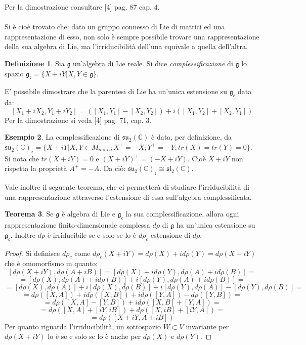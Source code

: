 \documentclass[12pt,a4paper]{report}
\theoremstyle{definition}
\newtheorem{Def}{Definizione}[chapter]
\newtheorem{Theo}[Def]{Teorema}
\theoremstyle{definition}
\newtheorem{Ex}[Def]{Esempio}
\theoremstyle{definition}
\theoremstyle{definition}
\begin{document}
Per la dimostrazione consultare [4] pag. 87 cap. 4.\\
\\
Si è cioè trovato che: dato un gruppo connesso di Lie di matrici ed una rappresentazione di esso, non solo è sempre possibile trovare una rappresentazione della sua algebra di Lie, ma l'irriducibilità dell'una equivale a quella dell'altra.
\begin{Def}
	Sia $\mathfrak{g}$ un'algebra di Lie reale. Si dice \textit{complessificazione} di $\mathfrak{g}$ lo spazio $\mathfrak{g_c}=\{X+iY|X,Y\in\mathfrak{g}\}$.
\end{Def}
E' possibile dimostrare che la parentesi di Lie ha un'unica estensione su $\mathfrak{g_c}$ data da:
$$[X_1+iX_2,Y_1+iY_2]=([X_1,Y_1]-[X_2,Y_2])+i([X_1,Y_2]+[X_2,Y_1])$$
Per la dimostrazione si veda [4] pag. 71, cap. 3.\\
\begin{Ex}
La complessificazione di $\mathfrak{su_2(\mathbb{C})}$ è data, per definizione, da \\$\mathfrak{su_2(\mathbb{C})_c}=\{X+iY|X,Y\in M_{n\times n} ;X^{+}=-X;Y^{+}=-Y;tr(X)=tr(Y)=0\}$.\\
Si nota che $tr(X+iY)=0$ e $(X+iY)^+=(-X+iY)$. Cioè $X+iY$ non rispetta la proprietà $A^+=-A$. Da ciò: $\mathfrak{su_2(\mathbb{C})_c}\cong \mathfrak{sl_2(\mathbb{C})}$.
\end{Ex}
Vale inoltre il seguente teorema, che ci permetterà di studiare l'irriducibilità di una rappresentazione attraverso l'estensione di essa sull'algebra complessificata.
\begin{Theo}
	Se $\mathfrak{g}$ è algebra di Lie e $\mathfrak{g_c}$ la sua complessificazione, allora ogni rappresentazione finito-dimensionale complessa  $d\rho$ di $\mathfrak{g}$ ha un'unica estensione su $\mathfrak{g_c}$. Inoltre $d\rho$ è irriducibile se e solo se lo è $d\rho_c$ estensione di $d\rho$.
\end{Theo}
\begin{proof}
	Si definisce $d\rho_c$ come $d\rho_c(X+iY)=d\rho(X)+id\rho(Y)=d\rho(X+iY)$ che è omomorfismo in quanto: 
	$$[d\rho(X+iY),d\rho(A+iB)]=[d\rho(X)+id\rho(Y),d\rho(A)+id\rho(B)]=$$$$=[d\rho(X),d\rho(A)+id\rho(B)]+i[d\rho(Y),d\rho(A)+id\rho(B)]=$$
	$$=[d\rho(X),d\rho(A)]+i[d\rho(X),d\rho(B)]+i[d\rho(Y),d\rho(A)]-[d\rho(Y),d\rho(B)]=$$
	$$=d\rho([X,A])+id\rho([X,B])+id\rho([Y,A])-d\rho([Y,B])=$$
	$$=d\rho([X,A]-[Y,B])+id\rho([X,B]+[Y,A])=$$
	$$=d\rho([X,A]+[iY,iB])+d\rho([X,iB]+[iY,A])=$$
	$$=d\rho([X+iY,A+iB])$$
	Per quanto riguarda l'irriducibilità, un sottospazio $W\subset V$ invariante per $d\rho(X+iY)$ lo è se e solo se lo è anche per $d\rho(X)$ e $d\rho(Y)$.
\end{proof}
\end{document}
